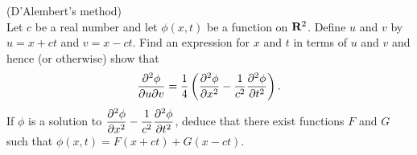 \documentclass[12pt]{article}
\begin{document}
\bigskip

\begin{question}(D'Alembert's method)\\
Let $c$ be a real number and let $\phi(x,t)$ be a function on $\mathbf{R}^2$. Define $u$ and $v$ by $u=x+ct$ and $v=x-ct$. Find an expression for $x$ and $t$ in terms of $u$ and $v$ and hence (or otherwise) show that
\[\dfrac{\partial^2 \phi}{\partial u\partial v}=\frac{1}{4}\left(\dfrac{\partial^2 \phi}{\partial x^2}-\frac{1}{c^2}\dfrac{\partial^2 \phi}{\partial t^2}\right).\]
If $\phi$ is a solution to $\dfrac{\partial^2 \phi}{\partial x^2}-\dfrac{1}{c^2}\dfrac{\partial^2 \phi}{\partial t^2}$, deduce that there exist functions $F$ and $G$ such that $\phi(x,t)=F(x+ct)+G(x-ct)$.
\end{question}
\end{document}
